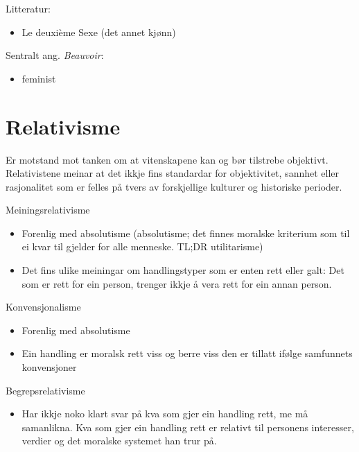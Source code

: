 \documentclass[a4paper]{IEEEtran}
\begin{document}
\begin{center}
Litteratur:
\end{center}
\begin{itemize}
    \item Le deuxième Sexe (det annet kjønn)
\end{itemize}\bigskip 

\begin{center}
Sentralt ang. \textit{Beauvoir}:
\end{center}
\begin{itemize}\bigskip
     \item feminist
\end{itemize}\bigskip

\bigskip
\section{Relativisme}
\label{relativisme}
Er motstand mot tanken om at vitenskapene kan og bør tilstrebe objektivt. Relativistene meinar at det ikkje fins standardar for objektivitet, sannhet eller rasjonalitet som er felles på tvers av forskjellige kulturer og historiske perioder.
\bigskip

Meiningsrelativisme\bigskip
\begin{itemize}
    \item Forenlig med absolutisme (absolutisme; det finnes moralske kriterium som til ei kvar til gjelder for alle menneske. TL;DR utilitarisme)
    \item Det fins ulike meiningar om handlingstyper som er enten rett eller galt: Det som er rett for ein person, trenger ikkje å vera rett for ein annan person.
\end{itemize}\bigskip

Konvensjonalisme\bigskip
\begin{itemize}
    \item Forenlig med absolutisme
    \item Ein handling er moralsk rett viss og berre viss den er tillatt ifølge samfunnets konvensjoner
\end{itemize}\bigskip

Begrepsrelativisme\bigskip
\begin{itemize}
    \item Har ikkje noko klart svar på kva som gjer ein handling rett, me må samanlikna. Kva som gjer ein handling rett er relativt til personens interesser, verdier og det moralske systemet han trur på.
\end{itemize}
\end{document}
